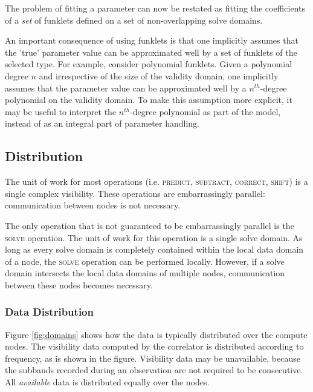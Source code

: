 \documentclass[10pt]{lofar}
\newcommand{\predict}{\textsc{predict}\xspace}
\newcommand{\subtract}{\textsc{subtract}\xspace}
\newcommand{\correct}{\textsc{correct}\xspace}
\newcommand{\solve}{\textsc{solve}\xspace}
\newcommand{\shift}{\textsc{shift}\xspace}
\begin{document}
The problem of fitting a parameter can now be restated as fitting the
coefficients of a \emph{set} of funklets defined on a set of non-overlapping
solve domains.

An important consequence of using funklets is that one implicitly assumes that
the 'true' parameter value can be approximated well by a set of funklets of the
selected type. For example, consider polynomial funklets. Given a polynomial
degree $n$ and irrespective of the size of the validity domain, one implicitly
assumes that the parameter value can be approximated well by a $n^{th}$-degree
polynomial on the validity domain. To make this assumption more explicit, it may
be useful to interpret the $n^{th}$-degree polynomial as part of the model,
instead of as an integral part of parameter handling.

\subsection{Distribution}
\label{subsec:distribution}

The unit of work for most operations (i.e. \predict, \subtract, \correct,
\shift) is a single complex visibility. These operations are embarrassingly
parallel: communication between nodes is not necessary.

The only operation that is not guaranteed to be embarrassingly parallel is the
\solve operation. The unit of work for this operation is a single solve domain.
As long as every solve domain is completely contained within the local data
domain of a node, the \solve operation can be performed locally. However, if a
solve domain intersects the local data domains of multiple nodes, communication
between these nodes becomes necessary.

\subsubsection{Data Distribution}
\label{subsubsec:distribution-data}
Figure \ref{fig:domains} shows how the data is typically distributed over the
compute nodes. The visibility data computed by the correlator is distributed
according to frequency, as is shown in the figure. Visibility data may be
unavailable, because the subbands recorded during an observation are not
required to be consecutive. All \emph{available} data is distributed equally
over the nodes. 
\end{document}
